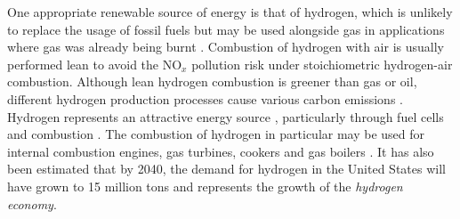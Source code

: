 One appropriate renewable source of energy is that of hydrogen, which is unlikely to replace the usage of fossil fuels but may be used alongside gas in applications where gas was already being burnt \cite{momirlan2005PropertiesHydrogenFuel}. Combustion of hydrogen with air is usually performed lean to avoid the NO$_x$ pollution risk under stoichiometric hydrogen-air combustion. Although lean hydrogen combustion is greener than gas or oil, different hydrogen production processes \cite{dasilvaveras2017HydrogenTrendsProduction} cause various carbon emissions \cite{nationalgrid2022HeatingOurHomes}. Hydrogen represents an attractive energy source \cite{momirlan2005PropertiesHydrogenFuel}, particularly through fuel cells \cite{momirlan2005PropertiesHydrogenFuel} and combustion \cite{lanz2001Module3Hydrogen, stepien2021ComprehensiveOverviewHydrogenFueled}. The combustion of hydrogen in particular may be used for internal combustion engines, gas turbines, cookers and gas boilers \cite{momirlan2005PropertiesHydrogenFuel}. It has also been estimated that by 2040, the demand for hydrogen in the United States will have grown to 15 million tons \cite{molkov2007HydrogenSafetyResearch} and represents the growth of the \emph{hydrogen economy}.

